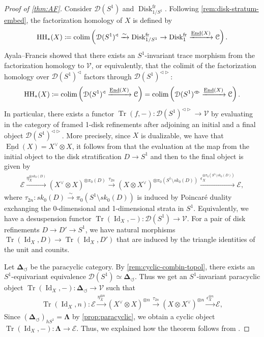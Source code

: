 \documentclass[11pt]{amsart}
\numberwithin{equation}{section}
\theoremstyle{plain}
\theoremstyle{definition}
\theoremstyle{remark}
\newcommand{\cC} { {\mathcal{C}}}
\newcommand{\cD} { {\mathcal{D}}}
\newcommand{\cE} { {\mathcal{E}}}
\newcommand{\cV} { {\mathcal{V}}}
\newcommand{\Id}{{\operatorname{Id}}}
\newcommand{\colim}{\operatornamewithlimits{colim}}
\newcommand\inEnd{\underline{\operatorname{End}}}
\newcommand\HH{\operatorname{HH}}
\newcommand\Tr{\operatorname{Tr}}
\begin{document}
\begin{proof}[Proof of \autoref{thm:AF}]
    Consider $\cD(S^1)$ and $\operatorname{Disk}_{1/S^1}^\text{fr}$. 
    Following \autoref{rem:disk-stratum-embed}, the factorization homology of $X$ is defined by \cite[Observation 2.3]{Ayala-Francis-FH-dim1}
    \[\HH_*(X) \coloneqq \colim \left( \cD(S^1)^{\triangleleft} \xrightarrow{\sim} \operatorname{Disk}_{1/S^1}^\text{fr} \to \operatorname{Disk}_{1}^\text{fr} \xrightarrow{\inEnd(X)} \cC \right).\]
    Ayala--Francis \cite[Theorem 2.6]{Ayala-Francis-FH-dim1} showed that there exists an $S^1$-invariant trace morphism from the factorization homology to $\cV$, or equivalently, that the colimit of the factorization homology over $\cD(S^1)^\triangleleft$ factors through $\cD(S^1)^{\triangleleft \triangleright}$:
    \[\HH_*(X) \coloneqq \colim \left( \cD(S^1)^{\triangleleft} \xrightarrow{\inEnd(X)} \cC \right) = \colim \left( \cD(S^1)^{\triangleleft \triangleright} \xrightarrow{\inEnd(X)} \cC \right).\]
    In particular, there exists a functor $\Tr(f, -): \cD(S^1)^{\triangleleft \triangleright} \to \cV$ by evaluating in the  category of framed 1-disk refinements after adjoining an initial and a final object $\cD(S^1)^{\triangleleft \triangleright}$. More precisely, since $X$ is dualizable, we have that $\inEnd(X) = X^\vee \otimes X$, it follows from \cite[Equation (10) \& (11)]{Ayala-Francis-FH-dim1} that the evaluation at the map from the initial object to the disk stratification $D \to S^1$ and then to the final object is given by
    \begin{align*}
        \cE \xrightarrow{\eta_X^{\otimes sk_0(D)}} (X^\vee \otimes X)^{\otimes \pi_0(D)} \xrightarrow{\tau_{2n}} (X \otimes X^\vee)^{\otimes \pi_0(S^1 \setminus sk_0(D))} \xrightarrow{\epsilon_X^{\otimes \pi_0(S^1 \setminus sk_0(D))}} \cE,
    \end{align*}
    where $\tau_{2n}: sk_0(D) \xrightarrow{\sim} \pi_0(S^1 \setminus sk_0(D))$ is induced by Poincar\'e duality exchanging the 0-dimensional and 1-dimensional strata in $S^1$. Equivalently, we have a desuspension functor $\Tr(\Id_X, -): \cD(S^1) \to \cV$. For a pair of disk refinements $D \to D' \to S^1$, we have natural morphisms $\Tr(\Id_X, D) \to \Tr(\Id_X, D')$ that are induced by the triangle identities of the unit and counits.
    
    Let $\boldsymbol{\Delta}_\circlearrowleft$ be the paracyclic category. By \autoref{rem:cyclic-combin-topol}, there exists an $S^1$-equivariant equivalence $\cD(S^1) \simeq \boldsymbol{\Delta}_\circlearrowleft$.
    Thus we get an $S^1$-invariant paracyclic object $\Tr(\Id_X, -) : \boldsymbol{\Delta}_\circlearrowleft \to \cV$ such that
    \begin{align*}
        \Tr(\Id_X, n): \cE \xrightarrow{\eta_X^{\otimes n}} (X^\vee \otimes X)^{\otimes n} \xrightarrow{\tau_{2n}} (X \otimes X^\vee)^{\otimes n} \xrightarrow{\epsilon_X^{\otimes n}} \cE,
    \end{align*}
    Since $(\boldsymbol{\Delta}_\circlearrowleft)_{hS^1} = \boldsymbol{\Lambda}$ by  \autoref{prop:paracyclic}, we obtain a cyclic object $\Tr(\Id_X, -) : \boldsymbol{\Lambda} \to \cE$. Thus, we explained how the theorem follows from \cite[Theorem 2.6]{Ayala-Francis-FH-dim1}.
\end{proof}
\end{document}
